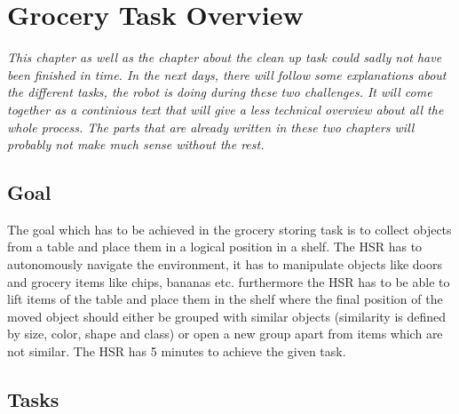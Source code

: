 \documentclass[main.tex]{subfiles}
\begin{document}
	
	\begingroup
	
	\renewcommand{\cleardoublepage}{}
	
	\renewcommand{\clearpage}{}
	
	\chapter{Grocery Task Overview}
	

\textit{This chapter as well as the chapter about the clean up task could sadly not have been finished in time. In the next days, there will follow some explanations about the different tasks, the robot is doing during these two challenges. It will come together as a continious text that will give a less technical overview about all the whole process. The parts that are already written in these two chapters will probably not make much sense without the rest.}

	\section{Goal}

	The goal which has to be achieved in the grocery storing task is to collect objects from a table and place them in a logical position in a shelf. The HSR has to autonomously navigate the environment, it has to manipulate objects like doors and grocery items like chips, bananas etc. furthermore the HSR has to be able to lift items of the table and place them in the shelf where the final position of the moved object should either be grouped with similar objects (similarity is defined by size, color, shape and class) or open a new group apart from items which are not similar. The HSR has 5 minutes to achieve the given task.
	

	\section{Tasks}
\end{document}
